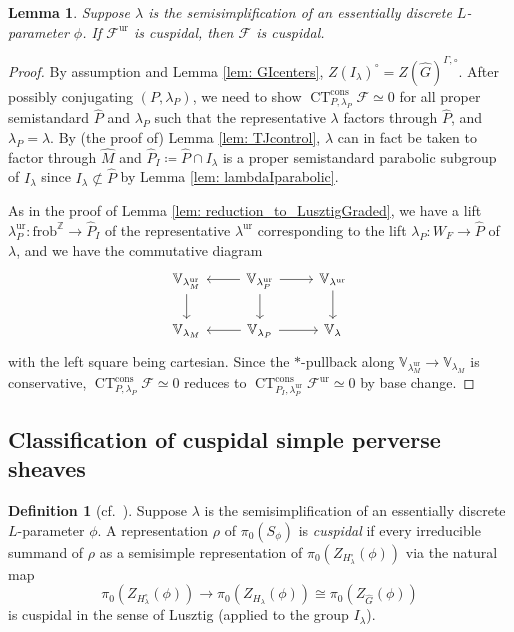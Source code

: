 \documentclass{amsart}
\newtheorem{lemma}[theorem]{Lemma}
\theoremstyle{definition}
\newtheorem{definition}[theorem]{Definition}
\theoremstyle{remark}
\numberwithin{equation}{section}
\newcommand{\mc}{\mathcal}
\newcommand{\Z}{\mathbb{Z}}
\newcommand{\wh}{\widehat}
\newcommand{\frob}{\mathrm{frob}}
\DeclareMathOperator{\CT}{\mathrm{CT}}
\newcommand{\ur}{\mathrm{ur}}
\newcommand{\V}{\mathbb{V}}
\begin{document}
\begin{lemma}
Suppose $\lambda$ is the semisimplification of an essentially discrete $L$-parameter $\phi$. If $\mc F^{\ur}$ is cuspidal, then $\mc F$ is cuspidal. 
\end{lemma}

\begin{proof}
By assumption and Lemma \ref{lem: GIcenters}, $Z(I_\lambda)^\circ = Z(\wh G)^{\Gamma, \circ}$. After possibly conjugating $(P, \lambda_P)$, we need to show $\CT_{P,\lambda_P}^{\mathrm{cons}} \mc F\simeq 0$ for all proper semistandard $\wh P$ and $\lambda_P$ such that the representative $\lambda$ factors through $\wh P$, and $\lambda_P=\lambda$. By (the proof of) Lemma \ref{lem: TJcontrol}, $\lambda$ can in fact be taken to factor through $\wh{M}$ and $\wh P_I\coloneq\wh P \cap I_{\lambda}$ is a proper semistandard parabolic subgroup of $I_\lambda$ since $I_\lambda \not\subset \wh P$ by Lemma \ref{lem: lambdaIparabolic}.

As in the proof of Lemma \ref{lem: reduction_to_LusztigGraded}, we have a lift $\lambda_P^\ur\colon \frob^\Z\to \wh P_I$ of the representative $\lambda^\ur$ corresponding to the lift $\lambda_P\colon W_F\to \wh P$ of $\lambda$, and we have the commutative diagram
\[
\begin{tikzcd}
    \V_{\lambda_{M}^{\ur}} \arrow[d] & \arrow[l] \V_{\lambda_{P}^{\ur}} \arrow[d] \arrow[r] & \V_{\lambda^{\ur}} \arrow[d] \\
    \V_{\lambda_M}  & \arrow[l] \V_{\lambda_P} \arrow[r] & \V_{\lambda}
\end{tikzcd}
\]
with the left square being cartesian. Since the $*$-pullback along $\V_{\lambda^\ur_M}\to \V_{\lambda_M}$ is conservative, $\CT_{P,\lambda_P}^\mathrm{cons} \mc F\simeq 0$ reduces to $\CT_{P_I,\lambda_P^\ur}^\mathrm{cons} \mc F^\ur\simeq 0$ by base change. 
\end{proof}

\subsection{Classification of cuspidal simple perverse sheaves}

\begin{definition}[{cf.~\cite[Definition 6.9]{AMS1}}]\label{def:purecuspidal}
Suppose $\lambda$ is the semisimplification of an essentially discrete $L$-parameter $\phi$. 
A representation $\rho$ of $\pi_0(S_\phi)$ is \emph{cuspidal} if every irreducible summand of $\rho$ as a semisimple representation of $\pi_0 (Z_{H_\lambda^\circ}(\phi))$ via the natural map
\[
\pi_0 (Z_{H_\lambda^\circ}(\phi)) \to \pi_0 (Z_{H_\lambda}(\phi))\cong \pi_0(Z_{\wh G}(\phi))
\]
is cuspidal in the sense of Lusztig (applied to the group $I_\lambda$). 
\end{definition}
\end{document}

